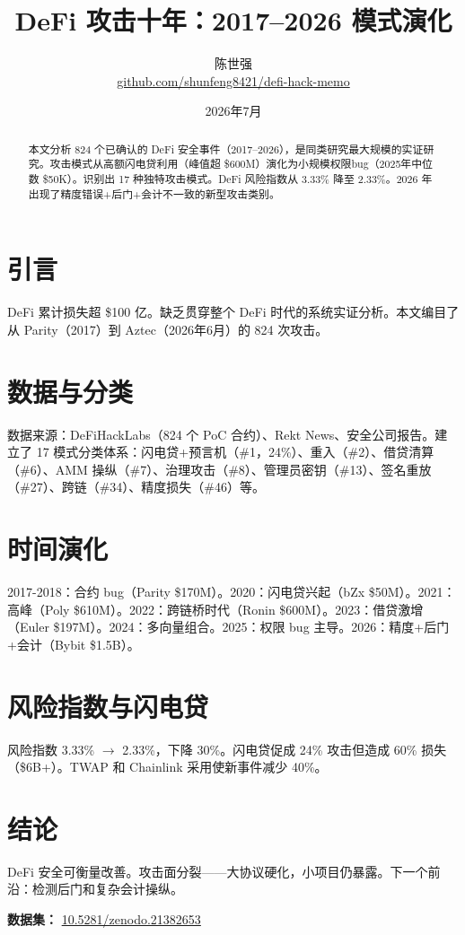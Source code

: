 \documentclass[11pt,a4paper]{ctexart}
\title{DeFi 攻击十年：2017--2026 模式演化}
\author{陈世强\\\small\url{github.com/shunfeng8421/defi-hack-memo}}
\date{2026年7月}
\begin{document}
\maketitle

\begin{abstract}
本文分析 824 个已确认的 DeFi 安全事件（2017--2026），是同类研究最大规模的实证研究。攻击模式从高额闪电贷利用（峰值超 \$600M）演化为小规模权限bug（2025年中位数 \$50K）。识别出 17 种独特攻击模式。DeFi 风险指数从 3.33\% 降至 2.33\%。2026 年出现了精度错误+后门+会计不一致的新型攻击类别。
\end{abstract}

\section{引言}
DeFi 累计损失超 \$100 亿。缺乏贯穿整个 DeFi 时代的系统实证分析。本文编目了从 Parity（2017）到 Aztec（2026年6月）的 824 次攻击。

\section{数据与分类}
数据来源：DeFiHackLabs（824 个 PoC 合约）、Rekt News、安全公司报告。建立了 17 模式分类体系：闪电贷+预言机（\#1，24\%）、重入（\#2）、借贷清算（\#6）、AMM 操纵（\#7）、治理攻击（\#8）、管理员密钥（\#13）、签名重放（\#27）、跨链（\#34）、精度损失（\#46）等。

\section{时间演化}
2017-2018：合约 bug（Parity \$170M）。2020：闪电贷兴起（bZx \$50M）。2021：高峰（Poly \$610M）。2022：跨链桥时代（Ronin \$600M）。2023：借贷激增（Euler \$197M）。2024：多向量组合。2025：权限 bug 主导。2026：精度+后门+会计（Bybit \$1.5B）。

\section{风险指数与闪电贷}
风险指数 3.33\% $\to$ 2.33\%，下降 30\%。闪电贷促成 24\% 攻击但造成 60\% 损失（\$6B+）。TWAP 和 Chainlink 采用使新事件减少 40\%。

\section{结论}
DeFi 安全可衡量改善。攻击面分裂——大协议硬化，小项目仍暴露。下一个前沿：检测后门和复杂会计操纵。

\vspace{1em}
\noindent\textbf{数据集：} \url{10.5281/zenodo.21382653}
\end{document}
